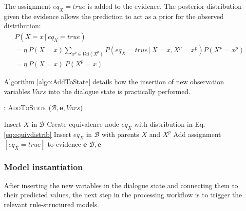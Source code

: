 The assignment $\mathit{eq}_{X} \!=\! true$ is added to the evidence. The posterior distribution given the evidence allows the prediction to act as a prior for the observed distribution:
\begin{align}
&P(X = x \, | \, \mathit{eq}_{X}\!=\!true) \nonumber \\
&=  \eta \ P(X\!=\!x)  \sum_{x^p \in \mathit{Val}(X^p)} P(\mathit{eq}_{X}\!=\!true\, |\, X\!=\!x, X^p \!=\!x^p ) P(X^p\!=\!x^p) \\
&= \eta \ P(X\!=\!x) \ P(X^p\!=\!x) \label{eq:equivalence}
\end{align}


Algorithm \ref{algo:AddToState} details how the insertion of new observation variables $\mathit{Vars}$ into the dialogue state is practically performed. 

\begin{algorithm}[ht]
\caption{: \textsc{AddToState} ($\mathcal{B}, \mathbf{e}, \mathit{Vars}$)}
\begin{algorithmic}[1] \vspace{1mm}
\STATE Insert $X$ in $\mathcal{B}$ 
\ENDIF
{}
\STATE Create equivalence node $\mathit{eq}_{X}$ with distribution in Eq. \eqref{eq:equivdistrib}
\STATE Insert $\mathit{eq}_{X}$ in $\mathcal{B}$ with parents $\mathit{X}$ and $\mathit{X}^p$
\STATE Add assignment $[\mathit{eq}_{X}\!=\!true]$ to evidence $\mathbf{e}$
\ENDIF
\ENDFOR
\RETURN $\mathcal{B}, \mathbf{e}$
\end{algorithmic}
\label{algo:AddToState}
\end{algorithm}



\subsubsection*{Model instantiation}

After inserting the new variables in the dialogue state and connecting them to their predicted values, the next step in the processing workflow is to trigger the relevant rule-structured models. 

